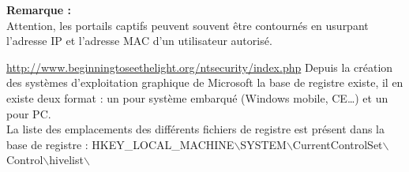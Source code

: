 \documentclass[a4paper,11pt]{article}				    %
\begin{document}
{\textbf{Remarque :}\\
Attention, les portails captifs peuvent souvent \^etre contourn\'es en usurpant l'adresse IP et l'adresse MAC d'un utilisateur autoris\'e.
}

{\url{http://www.beginningtoseethelight.org/ntsecurity/index.php}}
{
Depuis la cr\'eation des syst\`emes d'exploitation graphique de Microsoft la base de registre existe, il en existe deux format : un pour syst\`eme embarqu\'e (Windows mobile, CE\dots{}) et un pour PC. \\La liste des emplacements des diff\'erents fichiers de registre est pr\'esent dans la base de registre : HKEY\_LOCAL\_MACHINE$\backslash$SYSTEM$\backslash$CurrentControlSet$\backslash$Control$\backslash$hivelist$\backslash$
}
\end{document}
